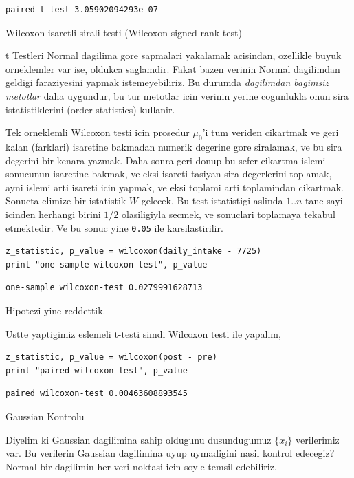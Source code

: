 \documentclass[12pt,fleqn]{article}\usepackage{../common}
\begin{document}
\begin{verbatim}
paired t-test 3.05902094293e-07
\end{verbatim}

Wilcoxon isaretli-sirali testi (Wilcoxon signed-rank test)

t Testleri Normal dagilima gore sapmalari yakalamak acisindan,
ozellikle buyuk orneklemler var ise, oldukca saglamdir. Fakat bazen
verinin Normal dagilimdan geldigi faraziyesini yapmak istemeyebiliriz.
Bu durumda {\em dagilimdan bagimsiz metotlar} daha uygundur, bu tur
metotlar icin verinin yerine cogunlukla onun sira istatistiklerini
(order statistics) kullanir.

Tek orneklemli Wilcoxon testi icin prosedur $\mu_0$'i tum veriden
cikartmak ve geri kalan (farklari) isaretine bakmadan numerik degerine
gore siralamak, ve bu sira degerini bir kenara yazmak. Daha sonra geri
donup bu sefer cikartma islemi sonucunun isaretine bakmak, ve eksi
isareti tasiyan sira degerlerini toplamak, ayni islemi arti isareti
icin yapmak, ve eksi toplami arti toplamindan cikartmak. Sonucta
elimize bir istatistik $W$ gelecek. Bu test istatistigi aslinda $1..n$
tane sayi icinden herhangi birini $1/2$ olasiligiyla secmek, ve
sonuclari toplamaya tekabul etmektedir. Ve bu sonuc yine \verb!0.05!
ile karsilastirilir.

\begin{verbatim}
z_statistic, p_value = wilcoxon(daily_intake - 7725)
print "one-sample wilcoxon-test", p_value
\end{verbatim}

\begin{verbatim}
one-sample wilcoxon-test 0.0279991628713
\end{verbatim}

Hipotezi yine reddettik.

Ustte yaptigimiz eslemeli t-testi simdi Wilcoxon testi ile yapalim,

\begin{verbatim}
z_statistic, p_value = wilcoxon(post - pre)
print "paired wilcoxon-test", p_value
\end{verbatim}

\begin{verbatim}
paired wilcoxon-test 0.00463608893545
\end{verbatim}

Gaussian Kontrolu

Diyelim ki Gaussian dagilimina sahip oldugunu dusundugumuz $\{ x_i\}$
verilerimiz var. Bu verilerin Gaussian dagilimina uyup uymadigini nasil
kontrol edecegiz? Normal bir dagilimin her veri noktasi icin soyle temsil
edebiliriz,
\end{document}
